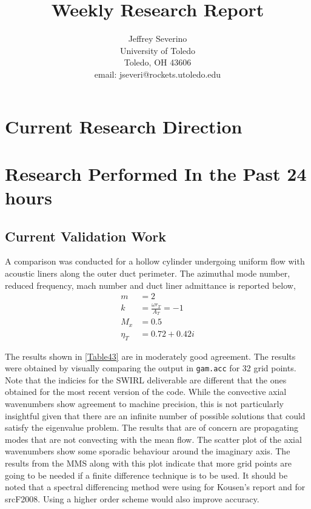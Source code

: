 \documentclass[a4paper]{article}
\begin{document}
\begin{titlepage}

    \title{
    Weekly Research Report}


    \author{ Jeffrey Severino \\
        University of Toledo \\
        Toledo, OH  43606 \\
    email: jseveri@rockets.utoledo.edu}


    \maketitle

\end{titlepage}
\section{Current Research Direction}
\section{Research Performed In the Past 24 hours}

\subsection{Current Validation Work}

A comparison was conducted for a hollow cylinder undergoing uniform flow with
acoustic liners along the outer duct perimeter. The azimuthal mode number, reduced 
frequency, mach number and duct liner admittance is reported below,
\begin{align*}
    m &= 2 \\
    k &= \frac{\omega r_T}{A_T} = -1 \\
    M_x &= 0.5 \\
    \eta_T &= 0.72 + 0.42i
\end{align*} 
%






The results shown in \ref{Table43} are in moderately good agreement. The 
results were obtained by visually comparing the output in \verb|gam.acc| for 32 
grid points. Note that the indicies for the SWIRL deliverable are different that 
the ones obtained for the most recent version of the code. While the 
convective axial wavenumbers show agreement to machine precision, this is not 
particularly insightful given that there are an infinite number of possible solutions 
that could satisfy the eigenvalue problem. The results that are of concern 
are propagating modes that are not convecting with the mean flow.  The scatter plot
of the axial wavenumbers show some sporadic behaviour around the imaginary axis.
The results from the MMS along with this plot indicate that more grid points are going 
to be needed if a finite difference technique is to be used. It should be 
noted that a spectral differencing method were using for Kousen's report and for
srcF2008. Using a higher order scheme would also improve accuracy.
\end{document}
